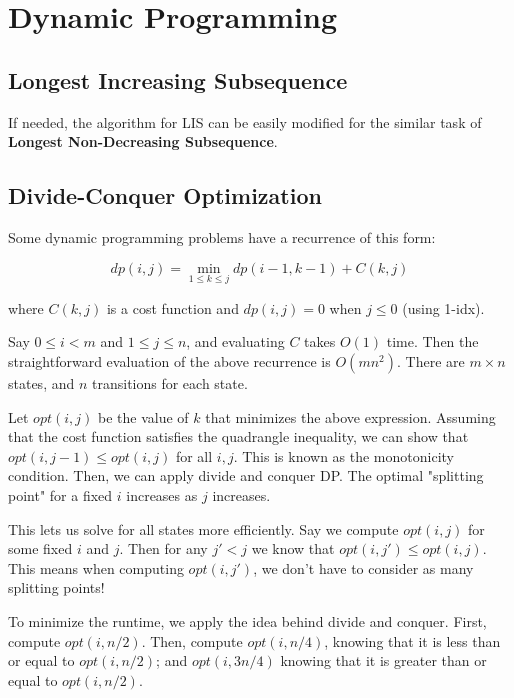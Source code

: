 \chapter{Dynamic Programming}

\section{Longest Increasing Subsequence}

    If needed, the algorithm for LIS can be easily modified for 
    the similar task of \textbf{Longest Non-Decreasing Subsequence}.


\section{Divide-Conquer Optimization}

    Some dynamic programming problems have a recurrence of this form:

        $$ dp(i, j) = \min_{1 \leq k \leq j} dp(i - 1, k - 1) + C(k, j) $$

        where $C(k, j)$ is a cost function and $dp(i, j) = 0$ when $j \leq 0$ (using 1-idx).

        Say $ 0 \leq i < m $ and $1 \leq j \leq n$, and evaluating $C$ takes $O(1)$ time. 
        Then the straightforward evaluation of the above recurrence is $O(m n^2)$. There are
        $m \times n$ states, and $n$ transitions for each state.

        Let $opt(i, j)$ be the value of $k$ that minimizes the above expression. 
        Assuming that the cost function satisfies the quadrangle inequality, we can show that
        $opt(i, j-1) \leq opt(i, j)$ for all $i, j$. This is known as the monotonicity condition. 
        Then, we can apply divide and conquer DP. The optimal "splitting point" for a fixed 
        $i$ increases as $j$ increases.

        This lets us solve for all states more efficiently. Say we compute 
        $opt(i, j)$ for some fixed $i$ and $j$. 
        Then for any $j' < j$ we know that $opt(i, j') \leq opt(i, j)$. 
        This means when computing $opt(i, j')$, we don't have to consider as many splitting points!

        To minimize the runtime, we apply the idea behind divide and conquer. First, compute
        $opt(i, n / 2)$. Then, compute 
        $opt(i, n / 4)$, knowing that it is less than or equal to $opt(i, n / 2)$; 
        and $opt(i, 3 n / 4)$ knowing that it is greater than or equal to $opt(i, n / 2)$. 
        
